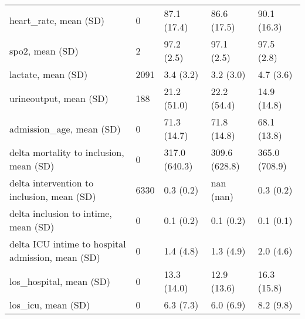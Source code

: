 \begin{tabular}{lllll}
heart\_rate, mean (SD)                             &       0 &    87.1 (17.4) &       86.6 (17.5) &            90.1 (16.3) \\
spo2, mean (SD)                                   &       2 &     97.2 (2.5) &        97.1 (2.5) &             97.5 (2.8) \\
lactate, mean (SD)                                &    2091 &      3.4 (3.2) &         3.2 (3.0) &              4.7 (3.6) \\
urineoutput, mean (SD)                            &     188 &    21.2 (51.0) &       22.2 (54.4) &            14.9 (14.8) \\
admission\_age, mean (SD)                          &       0 &    71.3 (14.7) &       71.8 (14.8) &            68.1 (13.8) \\
delta mortality to inclusion, mean (SD)           &       0 &  317.0 (640.3) &     309.6 (628.8) &          365.0 (708.9) \\
delta intervention to inclusion, mean (SD)        &    6330 &      0.3 (0.2) &         nan (nan) &              0.3 (0.2) \\
delta inclusion to intime, mean (SD)              &       0 &      0.1 (0.2) &         0.1 (0.2) &              0.1 (0.1) \\
delta ICU intime to hospital admission, mean (SD) &       0 &      1.4 (4.8) &         1.3 (4.9) &              2.0 (4.6) \\
los\_hospital, mean (SD)                           &       0 &    13.3 (14.0) &       12.9 (13.6) &            16.3 (15.8) \\
los\_icu, mean (SD)                                &       0 &      6.3 (7.3) &         6.0 (6.9) &              8.2 (9.8) \\
\bottomrule
\end{tabular}
